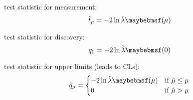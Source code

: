 test statistic for measurement:
\begin{equation}
	\tilde{t}_{\mu} = -2 \ln \tilde{\lambda}\parenths{\mu}
\end{equation}

test statistic for discovery:
\begin{equation}
	q_0 = -2 \ln \tilde{\lambda}\parenths{0}
\end{equation}

test statistic for upper limits (leads to CLs):
\begin{equation}
	\tilde{q}_{\mu} = 
	\begin{cases}
		-2 \ln \tilde{\lambda}\parenths{\mu} & \text{if~} \hat{\mu} \leq \mu \\
		0 & \text{if~} \hat{\mu} > \mu
	\end{cases}
\end{equation}


